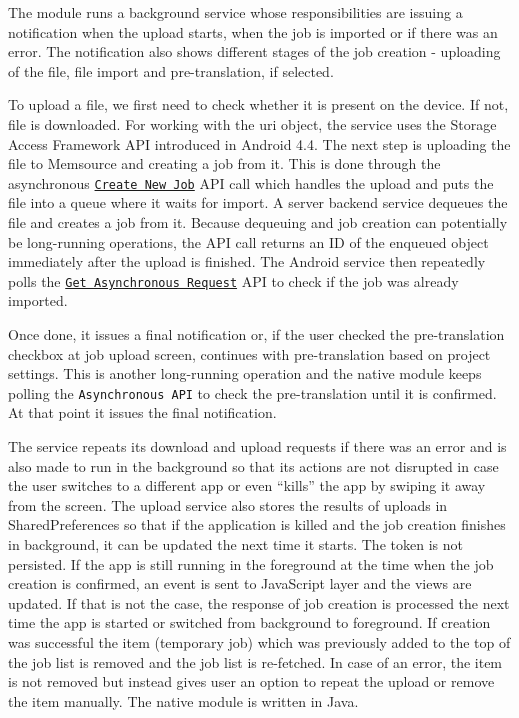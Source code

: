 

The module runs a background service whose responsibilities are issuing a notification when the upload starts, when the job is imported or if there was an error. The notification also shows different stages of the job creation - uploading of the file, file import and pre-translation, if selected. 

To upload a file, we first need to check whether it is present on the device. If not, file is downloaded. For working with the uri object, the service uses the Storage Access Framework API introduced in Android 4.4. The next step is uploading the file to Memsource and creating a job from it. This is done through  the asynchronous \href{http://wiki.memsource.com/wiki/Job_Asynchronous_API_v2#Create_New_Job}{\texttt{Create New Job}} API call which handles the upload and puts the file into a queue where it waits for import. A server backend service dequeues the file and creates a job from it. Because dequeuing and job creation can potentially be long-running operations, the API call returns an ID of the enqueued object immediately after the upload is finished. The Android service then repeatedly polls the \href{http://wiki.memsource.com/wiki/Asynchronous_API_v2#Get_Asynchronous_Request}{\texttt{Get Asynchronous Request}} API to check if the job was already imported.

Once done, it issues a final notification or, if the user checked the pre-translation checkbox at job upload screen, continues with pre-translation based on project settings. This is another long-running operation and the native module keeps polling the \texttt{Asynchronous API} to check the pre-translation until it is confirmed. At that point it issues the final notification.


The service repeats its download and upload requests if there was an error and is also made to run in the background so that its actions are not disrupted in case the user switches to a different app or even “kills” the app by swiping it away from the screen. The upload service also stores the results of uploads in SharedPreferences so that if the application is killed and the job creation finishes in background, it can be updated the next time it starts. The token is not persisted.
If the app is still running in the foreground at the time when the job creation is confirmed, an event is sent to JavaScript layer and the views are updated. If that is not the case, the response of job creation is processed the next time the app is started or switched from background to foreground. If creation was successful the item (temporary job) which was previously added to the top of the job list is removed and the job list is re-fetched. In case of an error, the item is not removed but instead gives user an option to repeat the upload or remove the item manually. The native module is written in Java. 
 

